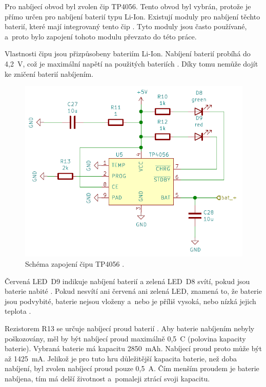   Pro nabíjecí obvod byl zvolen čip TP4056. Tento obvod byl vybrán, protože je přímo určen pro nabíjení baterií typu Li-Ion. Existují 
  moduly pro nabíjení těchto baterií, které mají integrovaný tento čip \cite{Nabijeci_modul}. Tyto moduly jsou často používané, a~proto 
  bylo zapojení tohoto modulu převzato do této práce. 

  Vlastnosti čipu jsou přizpůsobeny bateriím Li-Ion. Nabíjení baterií probíhá do 4,2~V, což je maximální napětí na použitých 
  bateriích \cite{18650} \cite{TP4056_datasheet}. Díky tomu nemůže dojít ke zničení baterií nabíjením.

  \begin{figure}[!h]
    \begin{center}
      \includegraphics[scale=0.7]{obrazky/TP4056_schema.png}
    \end{center}
    \caption[Schéma zapojení čipu TP4056 \cite{TP4056_datasheet}]{Schéma zapojení čipu TP4056 \cite{TP4056_datasheet}.}
  \end{figure}

  Červená LED~D9 indikuje nabíjení baterií a  zelená LED~D8 svítí, pokud jsou baterie nabité \cite{TP4056_datasheet}. 
  Pokud nesvítí ani červená ani zelená LED, znamená to, že baterie jsou podvybité, baterie nejsou vloženy a~nebo je příliš vysoká, 
  nebo nízká jejich teplota \cite{TP4056_datasheet}.

  Rezistorem R13 se určuje nabíjecí proud baterií \cite{TP4056_datasheet}. Aby baterie nabíjením nebyly poškozovány, měl by být nabíjecí 
  proud maximálně 0,5~C (polovina kapacity baterie). Vybraná baterie má kapacitu 2850~mAh. Nabíjecí proud proto může být až 1425~mA. 
  Jelikož je pro tuto hru důležitější kapacita baterie, než doba nabíjení, byl zvolen nabíjecí proud pouze 0,5~A. Čím menším proudem 
  je baterie nabíjena, tím má delší životnost a~pomaleji ztrácí svoji kapacitu.

